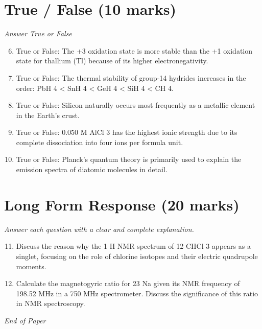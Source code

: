 \documentclass[12pt]{article}
\begin{document}
\section*{True / False (10 marks)}
\textit{Answer True or False}
\begin{enumerate}[label=\arabic*.]
\setcounter{enumi}{5}
\item True or False: The +3 oxidation state is more stable than the +1 oxidation state for thallium (Tl) because of its higher electronegativity.
\item True or False: The thermal stability of group-14 hydrides increases in the order: PbH 4 \textless{} SnH 4 \textless{} GeH 4 \textless{} SiH 4 \textless{} CH 4.
\item True or False: Silicon naturally occurs most frequently as a metallic element in the Earth's crust.
\item True or False: 0.050 M AlCl 3 has the highest ionic strength due to its complete dissociation into four ions per formula unit.
\item True or False: Planck's quantum theory is primarily used to explain the emission spectra of diatomic molecules in detail.
\end{enumerate}

\section*{Long Form Response (20 marks)}
\textit{Answer each question with a clear and complete explanation.}
\begin{enumerate}[label=\arabic*.]
\setcounter{enumi}{10}
\item Discuss the reason why the 1 H NMR spectrum of 12 CHCl 3 appears as a singlet, focusing on the role of chlorine isotopes and their electric quadrupole moments.
\item Calculate the magnetogyric ratio for 23 Na given its NMR frequency of 198.52 MHz in a 750 MHz spectrometer. Discuss the significance of this ratio in NMR spectroscopy.
\end{enumerate}

\vfill
\noindent\textit{End of Paper}
\end{document}
